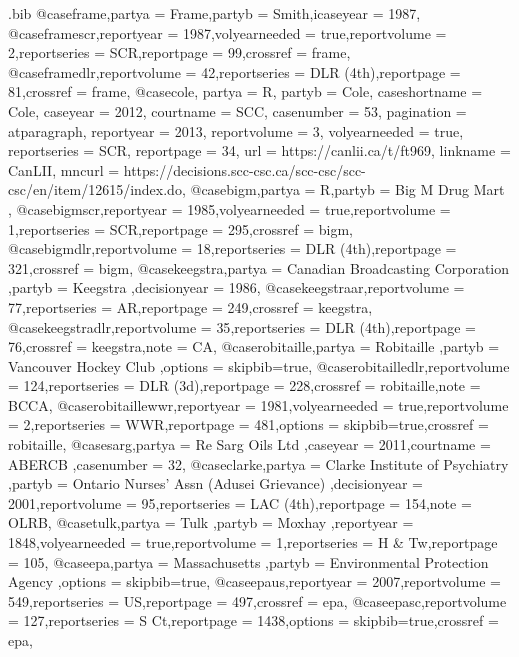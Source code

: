 \begin{filecontents*}[overwrite]{\jobname.bib}
@case{frame,partya = {Frame},partyb = {Smith},icaseyear = {1987},}
@case{framescr,reportyear = {1987},volyearneeded = {true},reportvolume = {2},reportseries = {SCR},reportpage = {99},crossref = {frame},}
@case{framedlr,reportvolume = {42},reportseries = {DLR (4th)},reportpage = {81},crossref = {frame},}
@case{cole,	partya =  {R},	partyb =  {Cole},	caseshortname =  {Cole},	caseyear =  {2012},	courtname =  {SCC},	casenumber =  {53},	pagination =  {atparagraph},	reportyear =  {2013},	reportvolume =  {3},	volyearneeded =  {true},	reportseries =  {SCR},	reportpage =  {34},	url =  {https://canlii.ca/t/ft969},	linkname =  {CanLII},	mncurl =  {https://decisions.scc-csc.ca/scc-csc/scc-csc/en/item/12615/index.do},					}
@case{bigm,partya = {R},partyb = {Big M Drug Mart },}
@case{bigmscr,reportyear = {1985},volyearneeded = {true},reportvolume = {1},reportseries = {SCR},reportpage = {295},crossref = {bigm},}
@case{bigmdlr,reportvolume = {18},reportseries = {DLR (4th)},reportpage = {321},crossref = {bigm},}
@case{keegstra,partya = {Canadian Broadcasting Corporation },partyb = {Keegstra },decisionyear = {1986},}
@case{keegstraar,reportvolume = {77},reportseries = {AR},reportpage = {249},crossref = {keegstra},}
@case{keegstradlr,reportvolume = {35},reportseries = {DLR (4th)},reportpage = {76},crossref = {keegstra},note = {CA},}
@case{robitaille,partya = {Robitaille },partyb = {Vancouver Hockey Club },options = {skipbib=true},}
@case{robitailledlr,reportvolume = {124},reportseries = {DLR (3d)},reportpage = {228},crossref = {robitaille},note = {BCCA},}
@case{robitaillewwr,reportyear = {1981},volyearneeded = {true},reportvolume = {2},reportseries = {WWR},reportpage = {481},options = {skipbib=true},crossref = {robitaille},}
@case{sarg,partya = {Re Sarg Oils Ltd },caseyear = {2011},courtname = {ABERCB },casenumber = {32},}
@case{clarke,partya = {Clarke Institute of Psychiatry },partyb = {Ontario Nurses' Assn (Adusei Grievance) },decisionyear = {2001},reportvolume = {95},reportseries = {LAC (4th)},reportpage = {154},note = {OLRB},}
@case{tulk,partya = {Tulk },partyb = {Moxhay },reportyear = {1848},volyearneeded = {true},reportvolume = {1},reportseries = {H \& Tw},reportpage = {105},}
@case{epa,partya = {Massachusetts },partyb = {Environmental Protection Agency },options = {skipbib=true},}
@case{epaus,reportyear = {2007},reportvolume = {549},reportseries = {US},reportpage = {497},crossref = {epa},}
@case{epasc,reportvolume = {127},reportseries = {S Ct},reportpage = {1438},options = {skipbib=true},crossref = {epa},}

\end{filecontents*}
